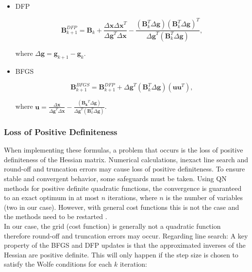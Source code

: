 \begin{itemize}
	\item DFP
	
	\begin{equation}
	 \mathbf{B}_{k+1}^{DFP} =  \mathbf{B}_k + 	\frac{{\Delta \mathbf{x}}   {\Delta \mathbf{x}}^{T}}		
	 {{\Delta \mathbf{g}}^{T}  {\Delta \mathbf{x}}  } -  \frac{(\mathbf{B}_{k}^{T}  {\Delta \mathbf{g}}) (\mathbf{B}_{k}^{T}  {\Delta \mathbf{g}})^{T}  }
	 {{\Delta \mathbf{g}}^{T} (\mathbf{B}_{k}^{T}  {\Delta \mathbf{g}})   },
	 \label{eq:DFP}
	\end{equation}
	
	where ${\Delta \mathbf{g}} = \mathbf{g}_{k+1} - \mathbf{g}_k $.
	
	\item BFGS
	
	\begin{equation}
	\mathbf{B}_{k+1}^{BFGS} =  \mathbf{B}_{k+1}^{DFP} + {\Delta \mathbf{g}}^{T}(\mathbf{B}_{k}^{T}  {\Delta \mathbf{g}})(\mathbf{u}  \mathbf{u}^{T})	,
	\end{equation}	
	
	where $\mathbf{u} = \frac{{\Delta \mathbf{x}}}		
	{{\Delta \mathbf{g}}^{T}  {\Delta \mathbf{x}}} - \frac{(\mathbf{B_{k}}^{T}  {\Delta \mathbf{g}})   }
	{{\Delta \mathbf{g}}^{T} (\mathbf{B}_{k}^{T}  {\Delta \mathbf{g}})   }$.
	

\end{itemize}


\subsubsection{Loss of Positive Definiteness}
\label{subsubsec:loss_pdness}

When implementing these formulas, a problem that occurs is the loss of positive definiteness of the Hessian matrix. Numerical calculations, inexact line search and round-off and truncation errors may cause loss of positive definiteness. To ensure stable and convergent behavior, some safeguards must be taken. 
Using QN methods for positive definite quadratic functions, the convergence is guaranteed to an exact optimum in at most $n$ iterations, where $n$ is the number of variables (two in our case).
However, with general cost functions this is not the case and the methods need to be restarted   \cite{intro_opt_design}. \\
%
In our case, the grid (cost function) is generally not a quadratic function therefore round-off and truncation errors may occur. 
Regarding line search: A key property of the BFGS and DFP updates is that the approximated inverses of the Hessian are positive definite. This will only happen if the step size is chosen to satisfy the Wolfe conditions for each $k$ iteration:


